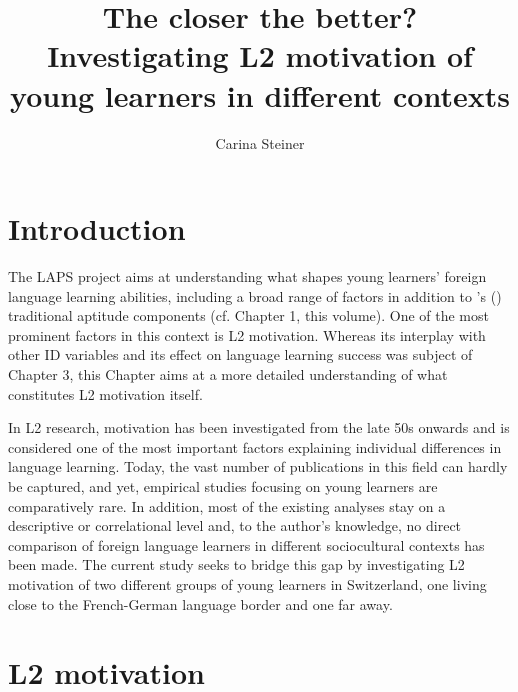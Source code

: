\documentclass[output=paper]{langsci/langscibook}
\author{Carina Steiner\orcid{}\affiliation{University of Bern, Center for the Study of Language and Society}}
\title[The closer the better?]{The closer the better? Investigating L2 motivation of young learners in different contexts}
\begin{document}
\maketitle 


\section{Introduction}

The LAPS project aims at understanding what shapes young learners’ foreign language learning abilities, including a broad range of factors in addition to \citeauthor{Carroll1958}’s (\citeyear{Carroll1958, Carroll1964}) traditional aptitude components (cf. Chapter 1, this volume). One of the most prominent factors in this context is L2 motivation. Whereas its interplay with other ID variables and its effect on language learning success was subject of Chapter 3, this Chapter aims at a more detailed understanding of what constitutes L2 motivation itself.

In L2 research, motivation has been investigated from the late 50s onwards and is considered one of the most important factors explaining individual differences in language learning. Today, the vast number of publications in this field can hardly be captured, and yet, empirical studies focusing on young learners are comparatively rare. In addition, most of the existing analyses stay on a descriptive or correlational level and, to the author’s knowledge, no direct comparison of foreign language learners in different sociocultural contexts has been made. The current study seeks to bridge this gap by investigating L2 motivation of two different groups of young learners in Switzerland, one living close to the French-German language border and one far away.

\section{L2 motivation}
\end{document}
